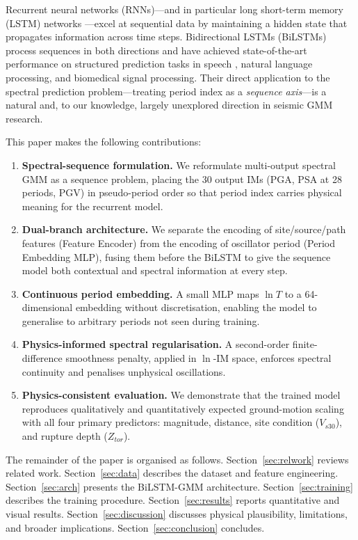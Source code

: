 \documentclass[12pt,a4paper]{article}
\begin{document}
Recurrent neural networks (RNNs)---and in particular long short-term memory
(LSTM) networks \citep{Hochreiter1997}---excel at sequential data by maintaining
a hidden state that propagates information across time steps.
Bidirectional LSTMs (BiLSTMs) \citep{Schuster1997} process sequences in both
directions and have achieved state-of-the-art performance on structured
prediction tasks in speech \citep{Graves2013}, natural language processing, and
biomedical signal processing.
Their direct application to the spectral prediction problem---treating period
index as a \emph{sequence axis}---is a natural and, to our knowledge, largely
unexplored direction in seismic GMM research.

This paper makes the following contributions:
\begin{enumerate}[leftmargin=*,label=\textbf{C\arabic*.}]
  \item \textbf{Spectral-sequence formulation.}
        We reformulate multi-output spectral GMM as a sequence problem, placing
        the 30 output IMs (PGA, PSA at 28 periods, PGV) in pseudo-period order
        so that period index carries physical meaning for the recurrent model.
  \item \textbf{Dual-branch architecture.}
        We separate the encoding of site/source/path features (Feature Encoder)
        from the encoding of oscillator period (Period Embedding MLP), fusing
        them before the BiLSTM to give the sequence model both contextual and
        spectral information at every step.
  \item \textbf{Continuous period embedding.}
        A small MLP maps $\ln T$ to a 64-dimensional embedding without
        discretisation, enabling the model to generalise to arbitrary periods not
        seen during training.
  \item \textbf{Physics-informed spectral regularisation.}
        A second-order finite-difference smoothness penalty, applied in $\ln$-IM
        space, enforces spectral continuity and penalises unphysical oscillations.
  \item \textbf{Physics-consistent evaluation.}
        We demonstrate that the trained model reproduces qualitatively and
        quantitatively expected ground-motion scaling with all four primary
        predictors: magnitude, distance, site condition ($V_{s30}$), and rupture
        depth ($Z_{tor}$).
\end{enumerate}

The remainder of the paper is organised as follows.
Section~\ref{sec:relwork} reviews related work.
Section~\ref{sec:data} describes the dataset and feature engineering.
Section~\ref{sec:arch} presents the BiLSTM-GMM architecture.
Section~\ref{sec:training} describes the training procedure.
Section~\ref{sec:results} reports quantitative and visual results.
Section~\ref{sec:discussion} discusses physical plausibility, limitations, and
broader implications.
Section~\ref{sec:conclusion} concludes.
\end{document}
